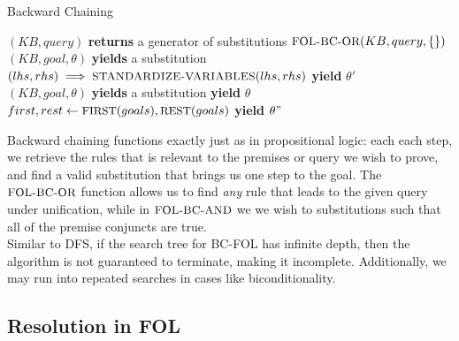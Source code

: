 \documentclass[12pt]{article}
\begin{document}
\begin{algorithm}
\caption{Backward Chaining}\label{euclid}
\begin{algorithmic}[1]
 {$(KB, query)$} \textbf{returns} a generator of substitutions
\State \Return $\textsc{\small{FOL-BC-OR}}(KB, query, \{ \})$
\EndProcedure\\

 {$(KB, goal, \theta)$} \textbf{yields} a substitution
\State $(lhs, rhs) \implies \textsc{\small{STANDARDIZE-VARIABLES}}(lhs, rhs)$
\State \textbf{yield} $\theta'$
\EndFor
\EndFor
\EndProcedure\\

 {$(KB, goal, \theta)$} \textbf{yields} a substitution
 \Return 
{} \textbf{yield} $\theta$
\Else
\State $first, rest \leftarrow \text{\small{FIRST}}(goals), \text{\small{REST}}(goals)$
\State \textbf{yield} $\theta"$
\EndFor
\EndFor
\EndIf
\EndProcedure
\end{algorithmic}
\end{algorithm}

Backward chaining functions exactly just as in propositional logic: each each step, we retrieve the rules that is relevant to the premises or query we wish to prove, and find a valid substitution that brings us one step to the goal. The $\textsc{\small{FOL-BC-OR}}$ function allows us to find \textit{any} rule that leads to the given query under unification, while in $\textsc{\small{FOL-BC-AND}}$ we we wish to substitutions such that all of the premise conjuncts are true.\\

Similar to DFS, if the search tree for BC-FOL has infinite depth, then the algorithm is not guaranteed to terminate, making it incomplete. Additionally, we may run into repeated searches in cases like biconditionality.

\subsection{Resolution in FOL}
\end{document}
